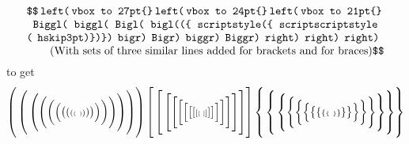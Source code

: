 $$\vbox{\tt \halign{#\hfil&#\cr
\$\$\\left(\\vbox to 27pt\lbr\rbr\\left(\\vbox to 24pt\lbr\rbr\\left(\\vbox to 21pt\lbr\rbr\cr
\\Biggl(\\biggl(\\Bigl(\\bigl((\lbr\\scriptstyle(\lbr\\scriptscriptstyle\cr
(\\hskip3pt)\rbr)\rbr)\\bigr)\\Bigr)\\biggr)\\Biggr)\\right)\\right)\\right)\cr
\qquad{\rm (With sets of three similar lines added for brackets and for braces)}\$\$\cr}}$$
to get
$$\left(\vbox to 27pt{}\left(\vbox to 24pt{}\left(\vbox to 21pt{}
\Biggl(\biggl(\Bigl(\bigl(({\scriptstyle({\scriptscriptstyle(\hskip3pt
)})})\bigr)\Bigr)\biggr)\Biggr)\right)\right)\right)
\left[\vbox to 27pt{}\left[\vbox to 24pt{}\left[\vbox to 21pt{}
\Biggl[\biggl[\Bigl[\bigl[[{\scriptstyle[{\scriptscriptstyle[\hskip3pt
]}]}]\bigr]\Bigr]\biggr]\Biggr]\right]\right]\right]
\left\{\vbox to 27pt{}\left\{\vbox to 24pt{}\left\{\vbox to 21pt{}
\Biggl\{\biggl\{\Bigl\{\bigl\{\{{\scriptstyle\{{\scriptscriptstyle\{\hskip3pt
\}}\}}\}\bigr\}\Bigr\}\biggr\}\Biggr\}\right\}\right\}\right\}$$

